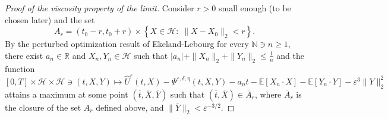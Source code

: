 \documentclass[reqno,11pt]{amsart}
\numberwithin{equation}{section}
\newcommand{\be}{\begin{equation}}
\newcommand{\ee}{\end{equation}}
\newcommand{\yh}[1]{{\color{orange}[YH: #1]}}
\newcommand{\R}{\mathbb{R}} %
\newcommand{\e}{\varepsilon}
\renewcommand{\hat}{\widehat}
\begin{document}
\begin{proof}[Proof of the viscosity property of the limit]
    Consider $r>0$ small enough (to be chosen later) and the set
    $$A_r=(t_0-r,t_0+r)\times \left\{ X\in\mathcal{H}:\; \|X-X_0\|_2< r  \right\}.$$
    By the perturbed optimization result of Ekeland-Lebourg \cite[Theorem 3.25]{fabbri2017stochastic} for every $\mathbb{N}\ni n\ge 1$, there exist $a_n\in \R$ and $X_n,Y_n\in \mathcal{H}$ such that $|a_n|+\|X_n\|_2+\|Y_n\|_2\le \frac{1}{n}$ and the function
    $$[0,T]\times\mathcal{H}\times\mathcal{H}\ni(t,X,Y)\mapsto\hat{U}^\e(t,X)-\Psi^{\e,\delta,\eta}(t,X,Y)-a_nt-\mathbb{E}[X_n\cdot X]-\mathbb{E}[Y_n\cdot Y]-\e^3 \|Y\|_2^2$$
    attains a maximum at some point $(\overline{t},\overline{X},\overline{Y})$ such that $(\overline{t},\overline{X})\in \overline{A}_r$, where $\overline{A}_r$ is the closure of the set $A_r$ defined above, and $\|\overline{Y}\|_2<\e^{-3/2}$.



\end{proof}
\end{document}
